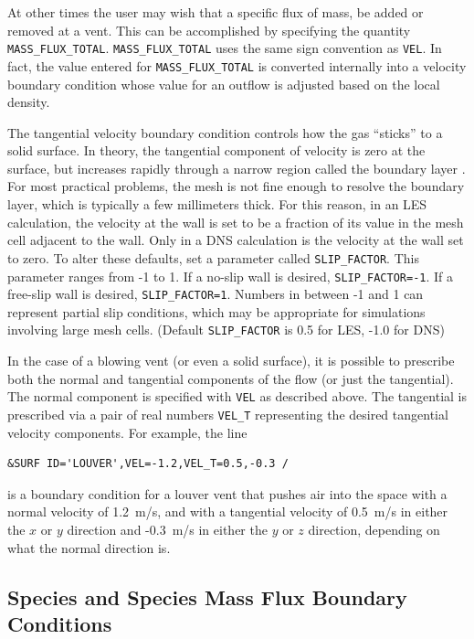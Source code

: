 \documentclass[11pt]{book}
\newcommand{\ct}{\tt\small}
\begin{document}
At other times the user may wish that a specific flux of mass, be added or removed at
a vent.  This can be accomplished by specifying the quantity {\ct MASS\_FLUX\_TOTAL}.
{\ct MASS\_FLUX\_TOTAL} uses the same sign convention as {\ct VEL}.  In fact, the value entered for
{\ct MASS\_FLUX\_TOTAL} is converted internally into a velocity boundary condition whose value
for an outflow is adjusted based on the local density.

The tangential velocity boundary condition controls how the gas
``sticks'' to a solid surface. In theory, the tangential
component of velocity is zero at the surface, but
increases rapidly through a narrow region called the boundary layer .
For most practical problems, the mesh is not fine enough to resolve the
boundary layer, which is typically a few millimeters thick.
For this reason, in an LES calculation, the velocity at the wall
is set to be a fraction of its value in the mesh cell adjacent to the
wall. Only in a DNS calculation is the velocity at the wall set to zero.
To alter these defaults, set a parameter called
{\ct SLIP\_FACTOR}.  This parameter ranges
from -1 to 1. If a no-slip wall is desired, {\ct SLIP\_FACTOR=-1}. If
a free-slip wall is desired, {\ct SLIP\_FACTOR=1}. Numbers in between
-1 and 1 can represent partial slip conditions, which may be
appropriate for simulations involving large mesh cells.
(Default {\ct SLIP\_FACTOR} is 0.5 for LES, -1.0 for DNS)

In the case of a blowing vent (or even a solid surface),
it is possible to prescribe both the normal and tangential components of the flow (or just the tangential).
The normal component is specified with {\ct VEL} as described above. The tangential is prescribed
via a pair of real numbers {\ct VEL\_T} representing the desired tangential
velocity components. For example, the line

\footnotesize
\begin{verbatim}
&SURF ID='LOUVER',VEL=-1.2,VEL_T=0.5,-0.3 /
\end{verbatim}
\normalsize

\noindent
is a boundary condition for a louver vent that pushes air into the
space with a normal velocity of 1.2~m/s, and with a tangential velocity
of 0.5~m/s in either the $x$ or $y$ direction and -0.3~m/s in either
the $y$ or $z$ direction, depending on what the normal direction is.

\subsection{Species and Species Mass Flux Boundary Conditions}
\end{document}
